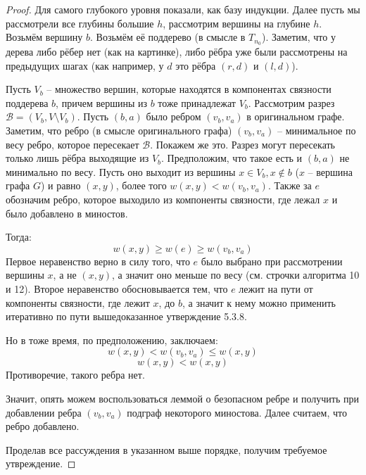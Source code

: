 \begin{proof}
        Для самого глубокого уровня показали, как базу индукции. Далее пусть мы рассмотрели все глубины большие $h$, рассмотрим вершины на глубине $h$.
        Возьмём вершину $b$. Возьмём её поддерево (в смысле в $T_{n_0}$). Заметим, что у дерева либо рёбер нет (как на картинке), либо рёбра уже были рассмотрены на предыдущих шагах (как например, у $d$ это рёбра $(r, d)$ и $(l, d)$).

        Пусть $V_b$ -- множество вершин, которые находятся в компонентах связности поддерева $b$, причем вершины из $b$ тоже принадлежат $V_b$. Рассмотрим разрез $\mathcal{B} = (V_b, V \setminus V_b)$. 
        Пусть $(b, a)$ было ребром $(v_b, v_a)$ в оригинальном графе.
        Заметим, что ребро (в смысле оригинального графа) $(v_b, v_a)$ -- минимальное по весу ребро, которое пересекает $\mathcal{B}$.
        Покажем же это. Разрез могут пересекать только лишь рёбра выходящие из $V_b$.
        Предположим, что такое есть и $(b, a)$ не минимально по весу. Пусть оно выходит из вершины $x \in V_b, x \not\in b$ ($x$ -- вершина графа $G$) и равно $(x, y)$, более того $w(x, y) < w(v_b, v_a)$. Также за $e$ обозначим ребро, которое выходило из компоненты связности, где лежал $x$ и было добавлено в миностов.

        Тогда:
        \begin{equation*}
            w(x, y) \geq w(e) \geq w(v_b, v_a)
        \end{equation*}
        Первое неравенство верно в силу того, что $e$ было выбрано при рассмотрении вершины $x$, а не $(x, y)$, а значит оно меньше по весу (см. строчки алгоритма 10 и 12). Второе неравенство обосновывается тем, что $e$ лежит на пути от компоненты связности, где лежит $x$, до $b$, а значит к нему можно применить итеративно по пути вышедоказанное утверждение 5.3.8.

        Но в тоже время, по предположению, заключаем:
        \begin{equation*}
            w(x, y) < w(v_b, v_a) \leq w(x, y)
        \end{equation*}
        \begin{equation*}
            w(x, y) < w(x, y)
        \end{equation*}
        Противоречие, такого ребра нет.

        Значит, опять можем воспользоваться леммой о безопасном ребре и получить при добавлении ребра $(v_b, v_a)$ подграф некоторого миностова. Далее считаем, что ребро добавлено.

        Проделав все рассуждения в указанном выше порядке, получим требуемое утвреждение.

\end{proof}
